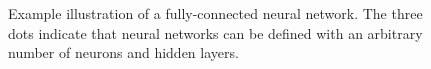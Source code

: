 \begin{figure}[t]
    \caption{Example illustration of a fully-connected neural network. The three dots indicate that neural networks can be defined with an arbitrary number of neurons and hidden layers.}
    \label{fig:neural-net}
\end{figure}




